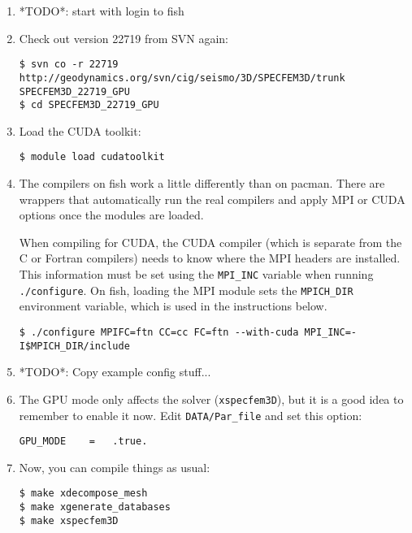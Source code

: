 \documentclass[10pt,fleqn,letterpaper]{article}
\begin{document}
\begin{enumerate}
\item *TODO*: start with login to fish

\item Check out version 22719 from SVN again:
\begin{lstlisting}
$ svn co -r 22719 http://geodynamics.org/svn/cig/seismo/3D/SPECFEM3D/trunk SPECFEM3D_22719_GPU
$ cd SPECFEM3D_22719_GPU
\end{lstlisting}

\item Load the CUDA toolkit:
\begin{lstlisting}
$ module load cudatoolkit
\end{lstlisting}

\item The compilers on fish work a little differently than on pacman. There are
      wrappers that automatically run the real compilers and apply MPI or CUDA
      options once the modules are loaded.

      When compiling for CUDA, the CUDA compiler (which is separate from the C
      or Fortran compilers) needs to know where the MPI headers are installed.
      This information must be set using the \verb|MPI_INC| variable when
      running \verb|./configure|. On fish, loading the MPI module sets the
      \verb|MPICH_DIR| environment variable, which is used in the instructions
      below.

\begin{lstlisting}
$ ./configure MPIFC=ftn CC=cc FC=ftn --with-cuda MPI_INC=-I$MPICH_DIR/include
\end{lstlisting}

\item *TODO*: Copy example config stuff...

\item The GPU mode only affects the solver (\verb|xspecfem3D|), but it is a good
      idea to remember to enable it now. Edit \verb|DATA/Par_file| and set this
      option:
\begin{lstlisting}
GPU_MODE    =   .true.
\end{lstlisting}

\item Now, you can compile things as usual:
\begin{lstlisting}
$ make xdecompose_mesh
$ make xgenerate_databases
$ make xspecfem3D
\end{lstlisting}


\end{enumerate}
\end{document}
